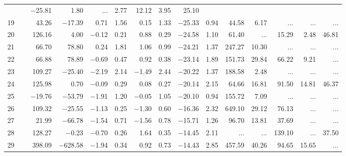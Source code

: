 \begin{table*}[p]
{\begin{tabular}{l@{ }r@{ \ }rr@{ \ }rr@{ \ }rrrr@{ \ }r@{ \ }r@{ \ }r@{ \ }r}
 & $-$25.81 &   1.80
  &    ...     &        2.77 &       12.12 &        3.95 &       25.10   \\     
 19   \ \dotfill \  &     43.26 &   $-$17.39 &    0.71 &   1.56 &    0.15 &   1.33
 & $-$25.33 &   0.94
  &       44.58 &        6.17 &    ...     &    ...     &    ...       \\     
 20   \ \dotfill \  &    126.16 &      4.00 &  $-$0.12 &   0.21 &    0.88 &   0.29
 & $-$24.58 &   1.10
  &       61.40 &    ...     &       15.29 &        2.48 &       46.81   \\     
 21   \ \dotfill \  &     66.70 &     78.80 &    0.24 &   1.81 &    1.06 &   0.99
 & $-$24.21 &   1.37
  &      247.27 &       10.30 &    ...     &    ...     &    ...       \\     
 22   \ \dotfill \  &     66.88 &     78.89 &  $-$0.69 &   0.47 &    0.92 &   0.38
 & $-$23.14 &   1.89
  &      151.73 &       29.84 &       66.22 &        9.21 &    ...       \\     
 23   \ \dotfill \  &    109.27 &   $-$25.40 &  $-$2.19 &   2.14 &  $-$1.49 &   2.44
 & $-$20.22 &   1.37
  &      188.58 &        2.48 &    ...     &    ...     &    ...       \\     
 24   \ \dotfill \  &    125.98 &      0.70 &  $-$0.09 &   0.29 &    0.08 &   0.27
 & $-$20.14 &   2.15
  &       64.66 &       16.81 &       91.50 &       14.81 &       46.37   \\     
 25   \ \dotfill \  &   $-$19.76 &   $-$53.79 &  $-$1.91 &   1.20 &  $-$0.05 &   1.05
 & $-$20.10 &   0.94
  &      155.72 &        7.09 &    ...     &    ...     &    ...       \\     
 26   \ \dotfill \  &    109.32 &   $-$25.55 &  $-$1.13 &   0.25 &  $-$1.30 &   0.60
 & $-$16.36 &   2.32
  &      649.10 &       29.12 &       76.13 &    ...     &    ...       \\     
 27   \ \dotfill \  &     21.99 &   $-$66.78 &  $-$1.54 &   0.71 &  $-$1.56 &   0.78
 & $-$15.71 &   1.26
  &       96.70 &       13.81 &       37.69 &    ...     &    ...       \\     
 28   \ \dotfill \  &    128.27 &    $-$0.23 &  $-$0.70 &   0.26 &    1.64 &   0.35
 & $-$14.45 &   2.11
  &    ...     &    ...     &      139.10 &    ...     &       37.50   \\     
 29   \ \dotfill \  &    398.09 &  $-$628.58 &  $-$1.94 &   0.34 &    0.92 &   0.73
 & $-$14.43 &   2.85
  &      457.59 &       40.26 &       94.65 &       15.65 &    ...       \\     

\end{tabular}}
\end{table*}
